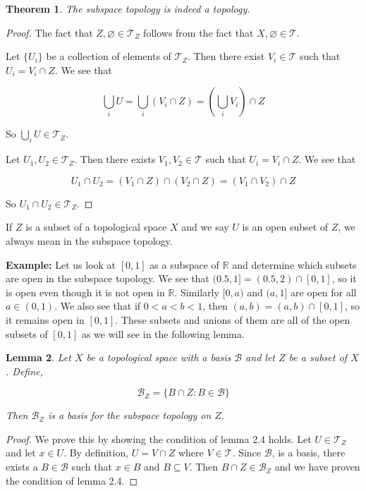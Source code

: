 \documentclass[a4paper]{article}
\newtheorem{theorem}{Theorem}
\newtheorem{lemma}[theorem]{Lemma}
\numberwithin{theorem}{section}
\begin{document}
\begin{theorem}
The subspace topology is indeed a topology.
\end{theorem}

\begin{proof}
The fact that $Z,\varnothing \in \mathcal{T}_{Z}$ follows from the fact that $X,\varnothing \in \mathcal{T}$.

Let $\{U_i\}$ be a collection of elements of $\mathcal{T}_{Z}$. Then there exist $V_i \in \mathcal{T}$ such that $U_i = V_i \cap Z$. We see that

$$ \underset{i}{\bigcup} U = \underset{i}{\bigcup} (V_i \cap Z) = \left(\underset{i}{\bigcup} V_i \right) \cap Z$$

So $\underset{i}{\bigcup} U \in \mathcal{T}_{Z}$.

Let $U_1,U_2 \in \mathcal{T}_{Z}$. Then there exists $V_1,V_2 \in \mathcal{T}$ such that $U_i = V_i \cap Z$. We see that

$$ U_1 \cap U_2 = (V_1 \cap Z) \cap (V_2 \cap Z) = (V_1 \cap V_2) \cap Z $$

So $U_1 \cap U_2 \in \mathcal{T}_{Z}$.

\end{proof}

If $Z$ is a subset of a topological space $X$ and we say $U$ is an open subset of $Z$, we always mean in the subspace topology.

\textbf{Example:} Let us look at $[0,1]$ as a subspace of $\mathbb{R}$ and determine which subsets are open in the subspace topology. We see that $(0.5,1] = (0.5,2) \cap [0,1]$, so it is open even though it is not open in $\mathbb{R}$. Similarly $[0,a)$ and $(a,1]$ are open for all $a \in (0,1)$. We also see that if $0<a<b<1$, then $(a,b) = (a,b) \cap [0,1]$, so it remains open in $[0,1]$. These subsets and unions of them are all of the open subsets of $[0,1]$ as we will see in the following lemma. \\

\begin{lemma}
Let $X$ be a topological space with a basis $\mathcal{B}$ and let $Z$ be a subset of $X$. Define,

$$ \mathcal{B}_{Z} = \{B \cap Z : B \in \mathcal{B}\} $$

Then $\mathcal{B}_{Z}$ is a basis for the subspace topology on $Z$.

\end{lemma}

\begin{proof}
We prove this by showing the condition of lemma 2.4 holds. Let $U \in \mathcal{T}_Z$ and let $x \in U$. By definition, $U = V \cap Z$ where $V \in \mathcal{T}$. Since $\mathcal{B}$, is a basis, there exists a $B \in \mathcal{B}$ such that $x \in B$ and $B \subseteq V$. Then $B \cap Z \in \mathcal{B}_Z$ and we have proven the condition of lemma 2.4.
\end{proof}
\end{document}

